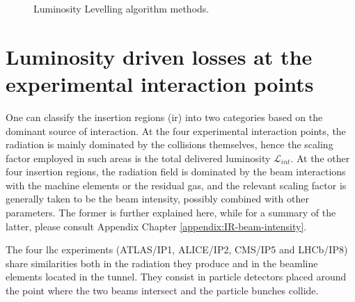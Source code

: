 \documentclass[encoding=utf8,british]{tumphthesis}
\begin{document}
\begin{figure}[H]
\begin{minipage}{.45\linewidth}
\end{minipage}\par\medskip
\centering
{}

\caption{Luminosity Levelling algorithm methods. \cite{Hostettler:2319396}}
\label{fig:luminosity-levelling}
\end{figure}







\section{Luminosity driven losses at the experimental interaction points}
\label{section:luminosity-driven-losses}

One can classify the insertion regions (\acrshort{ir}) into two categories based on the dominant source of interaction. At the four experimental interaction points, the radiation is mainly dominated by the collisions themselves, hence the scaling factor employed in such areas is the total delivered luminosity $\mathcal{L}_{int}$. At the other four insertion regions, the radiation field is dominated by the beam interactions with the machine elements or the residual gas, and the relevant scaling factor is generally taken to be the beam intensity, possibly combined with other parameters. The former is further explained here, while for a summary of the latter, please consult Appendix Chapter \ref{appendix:IR-beam-intensity}.

The four \acrshort{lhc} experiments (ATLAS/IP1, ALICE/IP2, CMS/IP5 and LHCb/IP8) share similarities both in the radiation they produce and in the beamline elements located in the tunnel. They consist in particle detectors placed around the point where the two beams intersect and the particle bunches collide. 
\end{document}
